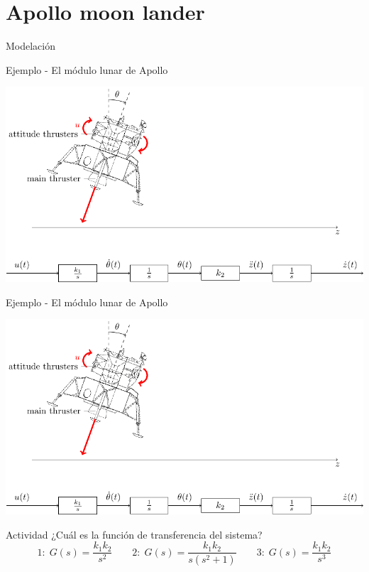 \documentclass[presentation,aspectratio=1610]{beamer}
\begin{document}
\section{Apollo moon lander}
\label{sec:org9aef93b}
\begin{frame}[label={sec:org3a0c0db}]{Modelación}
\end{frame}
\begin{frame}[label={sec:orgbb713d6}]{Ejemplo - El módulo lunar de Apollo}
\begin{center}
\includegraphics[width=\linewidth]{fig-apollo}
\end{center}
\end{frame}
\begin{frame}[label={sec:orgf920e21}]{Ejemplo - El módulo lunar de Apollo}
\begin{center}
\includegraphics[width=0.8\linewidth]{fig-apollo}
\end{center}
\alert{Actividad} ¿Cuál es la función de transferencia del sistema?
\[1: \; G(s) = \frac{k_1 k_2}{s^2}\qquad 2: \; G(s) = \frac{k_1 k_2}{s(s^2 + 1)} \qquad 3: \; G(s) = \frac{k_1 k_2}{s^3}\]
\end{frame}
\end{document}
